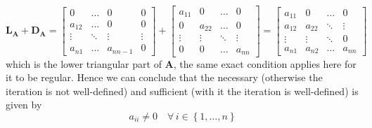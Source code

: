 \documentclass{article}
\newcommand\DA{\mathbf{D}_{\mathbf{A}}}
\newcommand\LA{\mathbf{L}_{\mathbf{A}}}
\begin{document}
\begin{equation*}
    \LA + \DA = \begin{bmatrix}
        0 & \dots & 0 & 0 \\
    a_{12} & \dots & 0 & 0 \\
     \vdots & \ddots & \vdots & \vdots \\
    a_{n1} & \dots & a_{nn-1} &0
    \end{bmatrix} + \begin{bmatrix}
        a_{11} & 0 & \dots & 0 \\
    0 & a_{22} & \dots & 0 \\
    \vdots & \vdots & \ddots & \vdots \\
   0& 0 & \dots & a_{nn}
    \end{bmatrix} = \begin{bmatrix}
    a_{11} & 0 & \dots & 0 \\
    a_{12} & a_{22} & \ddots & \vdots \\
    \vdots & \vdots &  \ddots& 0 \\
    a_{n1} & a_{n2} & \dots & a_{nn}
    \end{bmatrix}
\end{equation*}
which is the lower triangular part of $\mathbf{A}$, the same exact condition applies here for it to be regular. Hence we can conclude that the necessary (otherwise the iteration is not well-defined) and sufficient (with it the iteration is well-defined) is given by
\begin{equation*}
    a_{ii} \neq 0 \quad \forall \, i \in \left\{1, \dots, n\right\}
\end{equation*}
\end{document}
